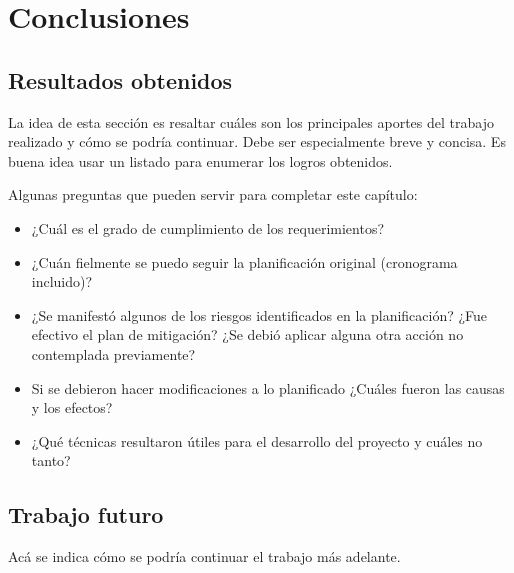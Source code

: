 
\chapter{Conclusiones} %

\label{Chapter5} %




\section{Resultados obtenidos}

La idea de esta sección es resaltar cuáles son los principales aportes del trabajo realizado y cómo se podría continuar. Debe ser especialmente breve y concisa. Es buena idea usar un listado para enumerar los logros obtenidos.

Algunas preguntas que pueden servir para completar este capítulo:

\begin{itemize}
\item ¿Cuál es el grado de cumplimiento de los requerimientos?
\item ¿Cuán fielmente se puedo seguir la planificación original (cronograma incluido)?
\item ¿Se manifestó algunos de los riesgos identificados en la planificación? ¿Fue efectivo el plan de mitigación? ¿Se debió aplicar alguna otra acción no contemplada previamente?
\item Si se debieron hacer modificaciones a lo planificado ¿Cuáles fueron las causas y los efectos?
\item ¿Qué técnicas resultaron útiles para el desarrollo del proyecto y cuáles no tanto?
\end{itemize}


\section{Trabajo futuro}

Acá se indica cómo se podría continuar el trabajo más adelante.
